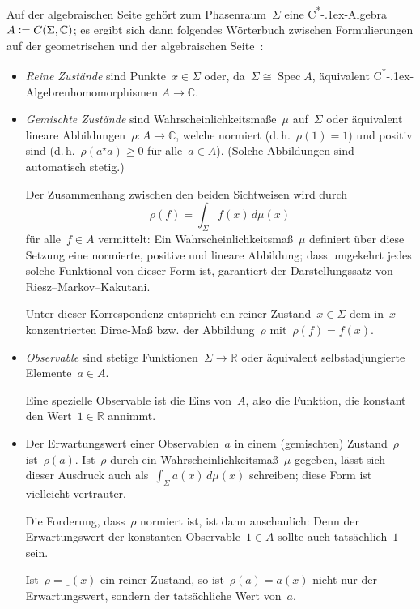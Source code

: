 \documentclass[a4paper,ngerman,12pt]{scrartcl}
\theoremstyle{definition}
\theoremstyle{plain}
\theoremstyle{remark}
\newcommand{\RR}{\mathbb{R}}
\newcommand{\CC}{\mathbb{C}}
\newcommand{\freist}{\underline{\ \ }}
\newcommand{\csalgebra}{C\textsuperscript{*}\kern-.1ex-Algebra}
\newcommand{\csalgebren}{C\textsuperscript{*}\kern-.1ex-Alge\-bren}
\DeclareMathOperator{\Spec}{Spec}
\renewcommand{\_}{\mathpunct{.}\,}
\newcommand{\?}{\,{:}\,}
\newcommand{\defeq}{\vcentcolon=}
\begin{document}
Auf der algebraischen Seite gehört zum Phasenraum~$\Sigma$ eine \csalgebra~$A
\defeq C(\Sigma, \CC)$; es ergibt sich dann folgendes Wörterbuch zwischen
Formulierungen auf der geometrischen und der algebraischen
Seite~\cite{nlab:classmech}:

\begin{itemize}
\item \emph{Reine Zustände} sind Punkte~$x \in \Sigma$ oder, da~$\Sigma \cong \Spec
A$, äquivalent \csalgebren{}\-ho\-mo\-mor\-phis\-men $A \to \CC$.

\item \emph{Gemischte Zustände} sind Wahrscheinlichkeitsmaße~$\mu$ auf~$\Sigma$ oder
äquivalent lineare Abbildungen~$\rho : A \to \CC$, welche normiert
(d.\,h.~$\rho(1) = 1$) und positiv sind (d.\,h.~$\rho(a^\star a) \geq 0$
für alle~$a \in A$). (Solche Abbildungen sind automatisch stetig.)

Der Zusammenhang zwischen den beiden Sichtweisen wird durch
\[ \rho(f) = \int_\Sigma f(x) \,d\mu(x) \]
für alle~$f \in A$ vermittelt: Ein Wahrscheinlichkeitsmaß~$\mu$ definiert über
diese Setzung eine normierte, positive und lineare Abbildung; dass umgekehrt
jedes solche Funktional von dieser Form ist, garantiert der Darstellungssatz
von Riesz--Markov--Kakutani.

Unter dieser Korrespondenz entspricht ein reiner Zustand~$x \in \Sigma$ dem
in~$x$ konzentrierten Dirac-Maß bzw. der Abbildung~$\rho$ mit~$\rho(f) =
f(x)$.

\item \emph{Observable} sind stetige Funktionen~$\Sigma \to \RR$ oder
äquivalent selbstadjungierte Elemente~$a \in A$.

Eine spezielle Observable ist die Eins von~$A$, also die Funktion, die konstant
den Wert~$1 \in \RR$ annimmt.

\item Der Erwartungswert einer Observablen~$a$ in einem (gemischten) Zustand~$\rho$
ist~$\rho(a)$. Ist~$\rho$ durch ein Wahrscheinlichkeitsmaß~$\mu$ gegeben,
lässt sich dieser Ausdruck auch als~$\int_\Sigma a(x) \,d\mu(x)$ schreiben;
diese Form ist vielleicht vertrauter.

Die Forderung, dass~$\rho$ normiert ist, ist dann anschaulich: Denn der
Erwartungswert der konstanten Observable~$1 \in A$ sollte auch tatsächlich~$1$
sein.

Ist~$\rho = \freist(x)$ ein reiner Zustand, so ist~$\rho(a) = a(x)$ nicht nur
der Erwartungswert, sondern der tatsächliche Wert von~$a$.
\end{itemize}
\end{document}
